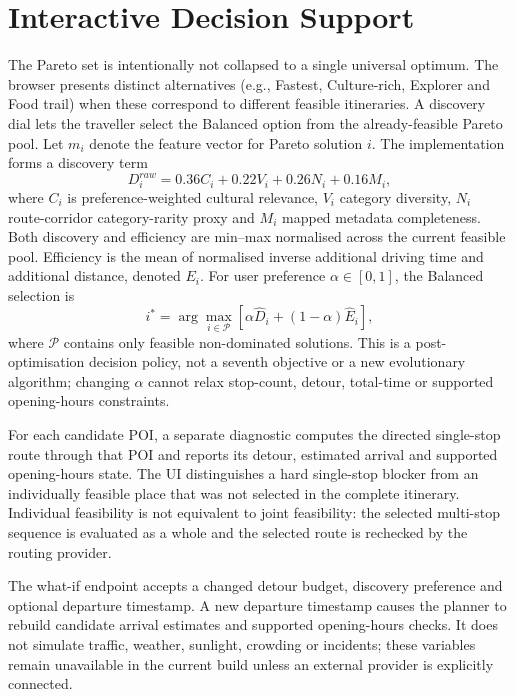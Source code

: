 \documentclass[10pt,conference]{IEEEtran}
\begin{document}
\section{Interactive Decision Support}
The Pareto set is intentionally not collapsed to a single universal optimum. The browser presents distinct alternatives (e.g., Fastest, Culture-rich, Explorer and Food trail) when these correspond to different feasible itineraries. A discovery dial lets the traveller select the Balanced option from the already-feasible Pareto pool. Let $m_i$ denote the feature vector for Pareto solution $i$. The implementation forms a discovery term
\begin{equation}
D_i^{raw}=0.36 C_i+0.22 V_i+0.26 N_i+0.16 M_i,
\end{equation}
where $C_i$ is preference-weighted cultural relevance, $V_i$ category diversity, $N_i$ route-corridor category-rarity proxy and $M_i$ mapped metadata completeness. Both discovery and efficiency are min--max normalised across the current feasible pool. Efficiency is the mean of normalised inverse additional driving time and additional distance, denoted $E_i$. For user preference $\alpha\in[0,1]$, the Balanced selection is
\begin{equation}
i^*=\arg\max_{i\in\mathcal{P}}\left[\alpha\widehat{D}_i+(1-\alpha)\widehat{E}_i\right],
\end{equation}
where $\mathcal{P}$ contains only feasible non-dominated solutions. This is a post-optimisation decision policy, not a seventh objective or a new evolutionary algorithm; changing $\alpha$ cannot relax stop-count, detour, total-time or supported opening-hours constraints.

For each candidate POI, a separate diagnostic computes the directed single-stop route through that POI and reports its detour, estimated arrival and supported opening-hours state. The UI distinguishes a hard single-stop blocker from an individually feasible place that was not selected in the complete itinerary. Individual feasibility is not equivalent to joint feasibility: the selected multi-stop sequence is evaluated as a whole and the selected route is rechecked by the routing provider.

The what-if endpoint accepts a changed detour budget, discovery preference and optional departure timestamp. A new departure timestamp causes the planner to rebuild candidate arrival estimates and supported opening-hours checks. It does not simulate traffic, weather, sunlight, crowding or incidents; these variables remain unavailable in the current build unless an external provider is explicitly connected.
\end{document}
